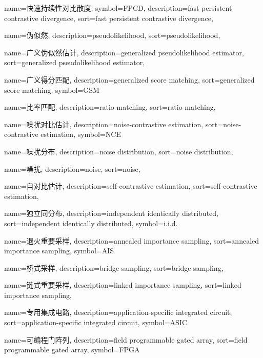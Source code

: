 {
  name=快速持续性对比散度,
  symbol={FPCD},
  description={fast persistent contrastive divergence},
  sort={fast persistent contrastive divergence},
}

{
  name=伪似然,
  description={pseudolikelihood},
  sort={pseudolikelihood},
}

{
  name=广义伪似然估计,
  description={generalized pseudolikelihood estimator},
  sort={generalized pseudolikelihood estimator},
}

{
  name=广义得分匹配,
  description={generalized score matching},
  sort={generalized score matching},
  symbol={GSM}
}

{
  name=比率匹配,
  description={ratio matching},
  sort={ratio matching},
}

{
  name=噪扰对比估计,
  description={noise-contrastive estimation},
  sort={noise-contrastive estimation},
  symbol={NCE}
}

{
  name=噪扰分布,
  description={noise distribution},
  sort={noise distribution},
}

{
  name=噪扰,
  description={noise},
  sort={noise},
}

{
  name=自对比估计,
  description={self-contrastive estimation},
  sort={self-contrastive estimation},
}

{
  name=独立同分布,
  description={independent identically distributed},
  sort={independent identically distributed},
  symbol={i.i.d.}
}

{
  name=退火重要采样,
  description={annealed importance sampling},
  sort={annealed importance sampling},
  symbol={AIS}
}

{
  name=桥式采样,
  description={bridge sampling},
  sort={bridge sampling},
}

{
  name=链式重要采样,
  description={linked importance sampling},
  sort={linked importance sampling},
}

{
  name=专用集成电路,
  description={application-specific integrated circuit},
  sort={application-specific integrated circuit},
  symbol={ASIC}
}

{
  name=可编程门阵列,
  description={field programmable gated array},
  sort={field programmable gated array},
  symbol={FPGA}
}

